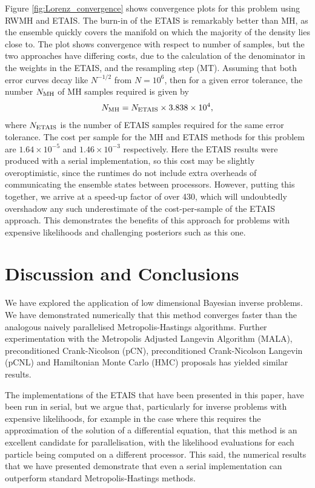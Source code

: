 \documentclass[final]{siamltex}
\newcommand{\revised}{}
\begin{document}
{\revised Figure \ref{fig:Lorenz_convergence} shows convergence plots for
  this problem using RWMH and ETAIS. The burn-in of the ETAIS is
  remarkably better than MH, as the ensemble quickly covers the
  manifold on which the majority of the density lies close to. The
  plot shows convergence with respect to number of samples, but the
  two approaches have differing costs, due to the calculation of the
  denominator in the weights in the ETAIS, and the resampling step
  (MT). Assuming that both error curves decay like $N^{-1/2}$ from
  $N=10^6$, then for a given error tolerance, the number $N_{\rm MH}$
  of MH samples required is given by
\[N_{\rm MH} = N_{\rm ETAIS} \times 3.838 \times 10^4,\]
where $N_{\rm ETAIS}$ is the number of ETAIS samples required for the
same error tolerance. The cost per sample for the MH and ETAIS methods
for this problem are $1.64 \times 10^{-5}$ and $1.46 \times 10^{-3}$
respectively. Here the ETAIS results were produced with a serial
implementation, so this cost may be slightly overoptimistic, since the
runtimes do not include extra overheads of communicating the ensemble
states between processors. However, putting this together, we arrive at a speed-up factor of
over 430, which will undoubtedly overshadow any such underestimate of
the cost-per-sample of the ETAIS approach. This demonstrates the benefits of this approach for
problems with expensive likelihoods and challenging posteriors such as
this one. 
}


\section{Discussion and Conclusions}\label{Sec:Conc} 

{\revised We have explored the application of 
low dimensional Bayesian inverse problems. We have demonstrated numerically
that this method converges faster than the analogous naively parallelised
Metropolis-Hastings algorithms.} Further experimentation with the Metropolis
Adjusted Langevin Algorithm (MALA), preconditioned Crank-Nicolson (pCN),
preconditioned Crank-Nicolson Langevin (pCNL) and Hamiltonian
Monte Carlo (HMC) proposals has yielded similar results\cite{Paul}.

{\revised The implementations of the ETAIS that have been presented in this
  paper, have been run in serial, but we argue that, particularly for
  inverse problems with expensive likelihoods, for example in the case
  where this requires the approximation of the solution of a
  differential equation, that this method is an excellent candidate
  for parallelisation, with the likelihood evaluations for each
  particle being computed on a different processor. This said, the numerical results that we have presented demonstrate
  that even a serial implementation can outperform standard
  Metropolis-Hastings methods.}
  
\end{document}
